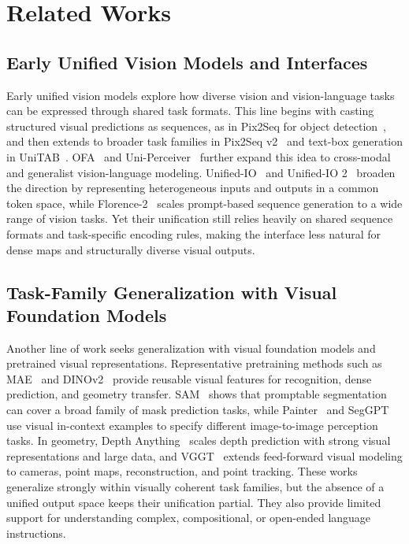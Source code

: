 \section{Related Works}
\label{sec:related_works}

\subsection{Early Unified Vision Models and Interfaces}

Early unified vision models explore how diverse vision and vision-language tasks can be expressed through shared task formats.
This line begins with casting structured visual predictions as sequences, as in Pix2Seq for object detection~\cite{pix2seq}, and then extends to broader task families in Pix2Seq v2~\cite{pix2seqv2} and text-box generation in UniTAB~\cite{unitab}.
OFA~\cite{ofa} and Uni-Perceiver~\cite{uniperceiver,uniperceiverv2} further expand this idea to cross-modal and generalist vision-language modeling.
Unified-IO~\cite{unifiedio} and Unified-IO 2~\cite{unifiedio2} broaden the direction by representing heterogeneous inputs and outputs in a common token space, while Florence-2~\cite{florence2} scales prompt-based sequence generation to a wide range of vision tasks.
Yet their unification still relies heavily on shared sequence formats and task-specific encoding rules, making the interface less natural for dense maps and structurally diverse visual outputs.

\subsection{Task-Family Generalization with Visual Foundation Models}

Another line of work seeks generalization with visual foundation models and pretrained visual representations.
Representative pretraining methods such as MAE~\cite{mae} and DINOv2~\cite{dinov2} provide reusable visual features for recognition, dense prediction, and geometry transfer.
SAM~\cite{sam} shows that promptable segmentation can cover a broad family of mask prediction tasks, while Painter~\cite{painter} and SegGPT~\cite{seggpt} use visual in-context examples to specify different image-to-image perception tasks.
In geometry, Depth Anything~\cite{depthanything} scales depth prediction with strong visual representations and large data, and VGGT~\cite{vggt} extends feed-forward visual modeling to cameras, point maps, reconstruction, and point tracking.
These works generalize strongly within visually coherent task families, but the absence of a unified output space keeps their unification partial.
They also provide limited support for understanding complex, compositional, or open-ended language instructions.

